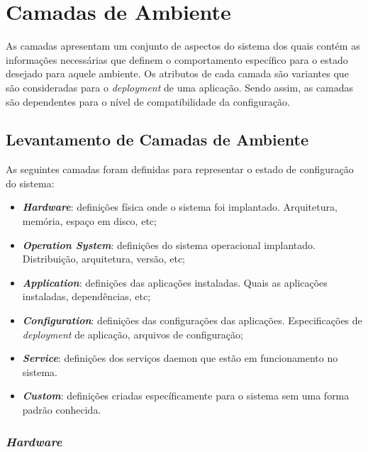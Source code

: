 \section{Camadas de Ambiente}
\label{sec:cam-amb}

As camadas apresentam um conjunto de aspectos do sistema dos quais contém as
informações necessárias que definem o comportamento específico para o
estado desejado para aquele ambiente. Os atributos de cada camada são variantes
que são consideradas para o \textit{deployment} de uma aplicação. Sendo assim, as
camadas são dependentes para o nível de compatibilidade da configuração.

\subsection{Levantamento de Camadas de Ambiente}
As seguintes camadas foram definidas para representar o estado de configuração do
sistema:
\begin{itemize}
  \item \textit{\textbf{Hardware}}: definições física onde o sistema foi implantado.
    Arquitetura, memória, espaço em disco, etc;
  \item \textit{\textbf{Operation System}}: definições do sistema operacional
    implantado. Distribuição, arquitetura, versão, etc;
  \item \textit{\textbf{Application}}: definições das aplicações instaladas.
    Quais as aplicações instaladas, dependências, etc;
  \item \textit{\textbf{Configuration}}: definições das configurações das
    aplicações. Especificações de \textit{deployment} de aplicação, arquivos
    de configuração;
  \item \textit{\textbf{Service}}: definições dos serviços daemon que estão em
    funcionamento no sistema.
  \item \textit{\textbf{Custom}}: definições criadas específicamente para o
    sistema sem uma forma padrão conhecida.
\end{itemize}

\subsubsection{\textit{Hardware}}
\label{sec:cam-hard}

